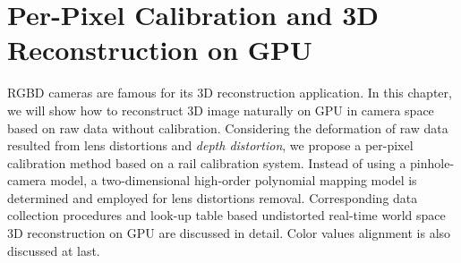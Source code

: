 \chapter{Per-Pixel Calibration and 3D Reconstruction on GPU} %
\label{chapterDataBasedCalibration} 
%
%
%


%
%
%
%
RGBD cameras are famous for its 3D reconstruction application. In this chapter, we will show how to reconstruct 3D image naturally on GPU in camera space based on raw data without calibration. Considering the deformation of raw data resulted from lens distortions and \emph{depth distortion}, we propose a per-pixel calibration method based on a rail calibration system. Instead of using a pinhole-camera model, a two-dimensional high-order polynomial mapping model is determined and employed for lens distortions removal. Corresponding data collection procedures and look-up table based undistorted real-time world space 3D reconstruction on GPU are discussed in detail. Color values alignment is also discussed at last.
%
